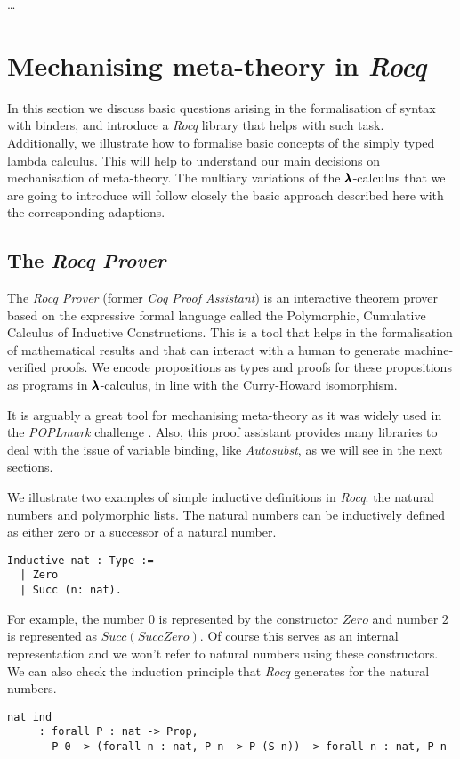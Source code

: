\dots


\section{Mechanising meta-theory in \textit{Rocq}}

In this section we discuss basic questions arising in the formalisation of syntax with binders, and introduce a \textit{Rocq} library that helps with such task.
Additionally, we illustrate how to formalise basic concepts of the simply typed lambda calculus.
This will help to understand our main decisions on mechanisation of meta-theory.
The multiary variations of the $\pmb{\lambda}$-calculus that we are going to introduce will follow closely the basic approach described here with the corresponding adaptions.

\subsection{The \textit{Rocq Prover}}

The \textit{Rocq Prover} (former \textit{Coq Proof Assistant}) \cite{RocqManual} is an interactive theorem prover based on the expressive formal language called the Polymorphic, Cumulative Calculus of Inductive Constructions.
This is a tool that helps in the formalisation of mathematical results and that can interact with a human to generate machine-verified proofs.
We encode propositions as types and proofs for these propositions as programs in $\pmb{\lambda}$-calculus, in line with the Curry-Howard isomorphism.

It is arguably a great tool for mechanising meta-theory as it was widely used in the \textit{POPLmark} challenge \cite{POPLmark}.
Also, this proof assistant provides many libraries to deal with the issue of variable binding, like \textit{Autosubst}, as we will see in the next sections.

We illustrate two examples of simple inductive definitions in \textit{Rocq}: the natural numbers and polymorphic lists.
The natural numbers can be inductively defined as either zero or a successor of a natural number.
\begin{lstlisting}[language=Coq]
  Inductive nat : Type :=
  | Zero
  | Succ (n: nat).
\end{lstlisting}

For example, the number $0$ is represented by the constructor \lst$Zero$ and number $2$ is represented as \lst$Succ (Succ Zero)$.
Of course this serves as an internal representation and we won't refer to natural numbers using these constructors.
We can also check the induction principle that \textit{Rocq} generates for the natural numbers.
\begin{lstlisting}[language=Coq]
  nat_ind
     : forall P : nat -> Prop,
       P 0 -> (forall n : nat, P n -> P (S n)) -> forall n : nat, P n
\end{lstlisting}

